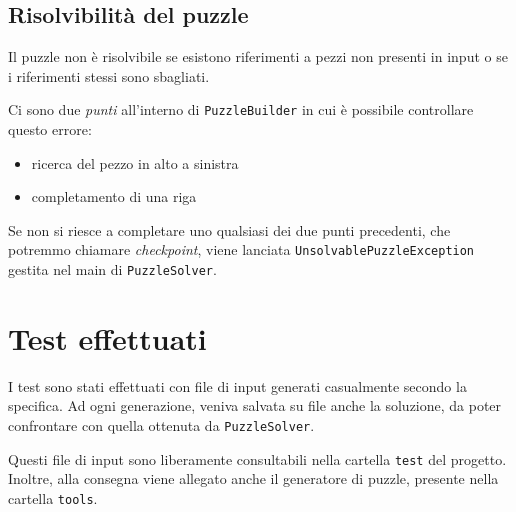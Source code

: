 \documentclass[a4paper, 12pt]{article}
\begin{document}
    \subsection{Risolvibilità del puzzle}

      Il puzzle non è risolvibile se esistono riferimenti a pezzi non presenti in input o se i riferimenti stessi sono sbagliati.

      Ci sono due \emph{punti} all'interno di \verb|PuzzleBuilder| in cui è possibile controllare questo errore:

      \begin{itemize}

        \item ricerca del pezzo in alto a sinistra
        \item completamento di una riga

      \end{itemize}

      Se non si riesce a completare uno qualsiasi dei due punti precedenti, che potremmo chiamare \emph{checkpoint}, viene lanciata \verb|UnsolvablePuzzleException| gestita nel main di \verb|PuzzleSolver|.

  \section{Test effettuati}

    I test sono stati effettuati con file di input generati casualmente secondo la specifica. Ad ogni generazione, veniva salvata su file anche la soluzione, da poter confrontare con quella ottenuta da \verb|PuzzleSolver|. 

    Questi file di input sono liberamente consultabili nella cartella \verb|test| del progetto. Inoltre, alla consegna viene allegato anche il generatore di puzzle, presente nella cartella \verb|tools|.
\end{document}
